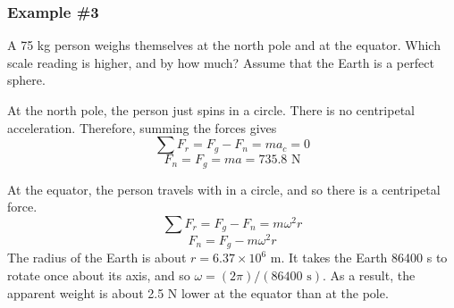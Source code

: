 \subsubsection{Example \#3}
A 75 kg person weighs themselves at the north pole and at the equator. Which scale reading is higher, and by how much? Assume that the Earth is a perfect sphere.

At the north pole, the person just spins in a circle. There is no centripetal acceleration. Therefore, summing the forces gives
$$\sum F_r=F_g-F_n=ma_c=0$$
$$F_n=F_g=ma=735.8\mbox{ N}$$

At the equator, the person travels with in a circle, and so there is a centripetal force.
$$\sum F_r=F_g-F_n=m\omega^2r$$
$$F_n=F_g-m\omega^2r$$
The radius of the Earth is about $r=6.37\times 10^6\mbox{ m}$. It takes the Earth 86400 s to rotate once about its axis, and so $\omega=(2\pi)/(86400\mbox{ s})$. As a result, the apparent weight is about 2.5 N lower at the equator than at the pole.




\clearpage
